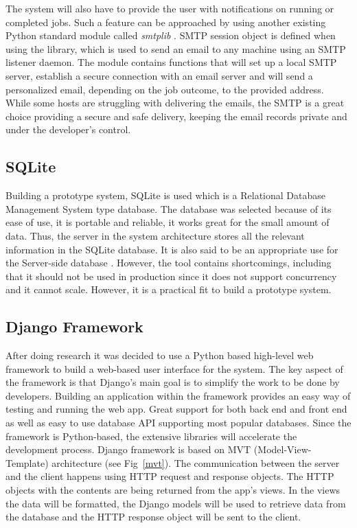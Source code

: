 \documentclass[10pt]{report}
\begin{document}
The system will also have to provide the user with notifications on running or completed jobs. Such a feature can be approached by using another existing Python standard module called \textit{smtplib} \cite{smtp}. SMTP session object is defined when using the library, which is used to send an email to any machine using an SMTP listener daemon. The module contains functions that will set up a local SMTP server, establish a secure connection with an email server and will send a personalized email, depending on the job outcome, to the provided address. While some hosts are struggling with delivering the emails, the SMTP is a great choice providing a secure and safe delivery, keeping the email records private and under the developer's control.

\subsection{SQLite}

Building a prototype system, SQLite is used which is a Relational Database Management System type database. The database was selected because of its ease of use, it is portable and reliable, it works great for the small amount of data. Thus, the server in the system architecture stores all the relevant information in the SQLite database. It is also said to be an appropriate use for the Server-side database \cite{sqlite}. However, the tool contains shortcomings, including that it should not be used in production since it does not support concurrency and it cannot scale. However, it is a practical fit to build a prototype system.

\subsection{Django Framework} \label{djngo}

After doing research it was decided to use a Python based high-level web framework to build a web-based user interface for the system. The key aspect of the framework is that Django's main goal is to simplify the work to be done by developers. Building an application within the framework provides an easy way of testing and running the web app. Great support for both back end and front end as well as easy to use database API supporting most popular databases. Since the framework is Python-based, the extensive libraries will accelerate the development process. Django framework is based on MVT (Model-View-Template) architecture (see Fig~\ref{mvt}). The communication between the server and the client happens using HTTP request and response objects. The HTTP objects with the contents are being returned from the app's views. In the views the data will be formatted, the Django models will be used to retrieve data from the database and the HTTP response object will be sent to the client.
\end{document}
